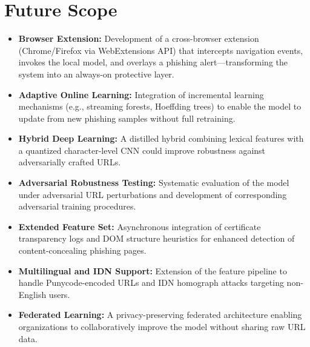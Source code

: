 \documentclass[conference]{IEEEtran}
\begin{document}
\section{Future Scope}
\label{sec:future}

\begin{itemize}[leftmargin=*]
    \item \textbf{Browser Extension:} Development of a 
    cross-browser extension (Chrome/Firefox via WebExtensions 
    API) that intercepts navigation events, invokes the local 
    model, and overlays a phishing alert—transforming the 
    system into an always-on protective layer.
    
    \item \textbf{Adaptive Online Learning:} Integration of 
    incremental learning mechanisms (e.g., streaming forests, 
    Hoeffding trees) to enable the model to update from new 
    phishing samples without full retraining.
    
    \item \textbf{Hybrid Deep Learning:} A distilled hybrid 
    combining lexical features with a quantized character-level 
    CNN could improve robustness against adversarially crafted 
    URLs.
    
    \item \textbf{Adversarial Robustness Testing:} Systematic 
    evaluation of the model under adversarial URL perturbations 
    and development of corresponding adversarial training 
    procedures.
    
    \item \textbf{Extended Feature Set:} Asynchronous 
    integration of certificate transparency logs and DOM 
    structure heuristics for enhanced detection of 
    content-concealing phishing pages.
    
    \item \textbf{Multilingual and IDN Support:} Extension of 
    the feature pipeline to handle Punycode-encoded URLs and 
    IDN homograph attacks targeting non-English users.
    
    \item \textbf{Federated Learning:} A privacy-preserving 
    federated architecture enabling organizations to 
    collaboratively improve the model without sharing raw URL 
    data.
\end{itemize}
\end{document}
